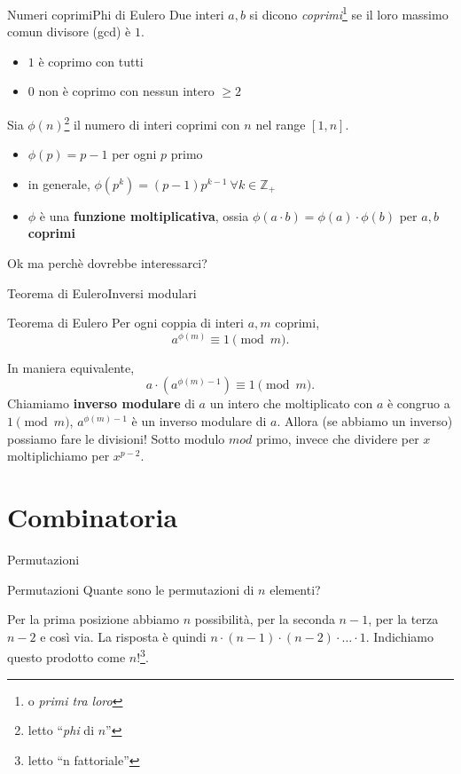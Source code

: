 \documentclass[compress]{beamer}
\begin{document}
\begin{frame}{Numeri coprimi}{Phi di Eulero}
    Due interi $a, b$ si dicono \textit{coprimi}\footnote{o \textit{primi tra loro}} se il loro massimo comun divisore (gcd) \`e $1$.
    \begin{itemize}
        \item $1$ \`e coprimo con tutti
        \item $0$ non \`e coprimo con nessun intero $\geq 2$
    \end{itemize}
    \pause
    \vfill
    Sia $\phi(n)$\footnote{letto ``\textit{phi} di $n$''} il numero di interi coprimi con $n$ nel range $[1, n]$.
    \begin{block}{}
    \begin{itemize}
        \item $\phi(p) = p-1$ per ogni $p$ primo
        \item in generale, $\phi(p^k) = (p-1)p^{k-1} \ \forall k \in \mathbb{Z}_+$
        \item $\phi$ \`e una \textbf{funzione moltiplicativa}, ossia $\phi(a \cdot b) = \phi(a) \cdot \phi(b)$ per $a, b$ \textbf{coprimi}
    \end{itemize}
    \end{block}
    \pause
    \vfill
    Ok ma perch\`e dovrebbe interessarci?
\end{frame}

\begin{frame}{Teorema di Eulero}{Inversi modulari}
    \begin{block}{Teorema di Eulero}
        Per ogni coppia di interi $a,m$ coprimi,
        $$a^{\phi (m)} \equiv 1 \pmod m.$$
    \end{block}
    \pause
    In maniera equivalente,
    $$a \cdot (a^{\phi (m) - 1}) \equiv 1 \pmod m.$$
    \vfill
    Chiamiamo \textbf{inverso modulare} di $a$ un intero che moltiplicato con $a$ \`e congruo a $1 \pmod m$, $a^{\phi(m) - 1}$ \`e un inverso modulare di $a$.
    \pause
    \vfill
    Allora (se abbiamo un inverso) possiamo fare le divisioni!
    \vfill
    Sotto modulo $mod$ primo, invece che dividere per $x$ moltiplichiamo per $x^{p-2}$.
\end{frame}


\section{Combinatoria}
\begin{frame}{Permutazioni}
    \begin{exampleblock}{Permutazioni}
        Quante sono le permutazioni di $n$ elementi?
    \end{exampleblock}
    \vfill
    \pause
    Per la prima posizione abbiamo $n$ possibilit\`a, per la seconda $n-1$, per la terza $n-2$ e cos\`i via.
    \vfill
    \pause
    La risposta \`e quindi $n \cdot (n-1) \cdot (n-2) \cdot \dots \cdot 1$. Indichiamo questo prodotto come 
    $n!$\footnote{letto ``n fattoriale''}.
\end{frame}
\end{document}
